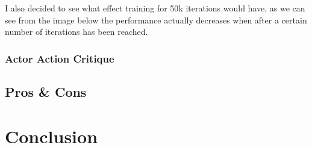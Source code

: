 \documentclass[conference]{IEEEtran}
\begin{document}
I also decided to see what effect training for 50k iterations would have, as we can see from the image below the performance actually decreases when after a certain number of iterations has been reached.  

\subsubsection{Actor Action Critique}

\subsection{Pros \& Cons}
\section{Conclusion}
\end{document}
